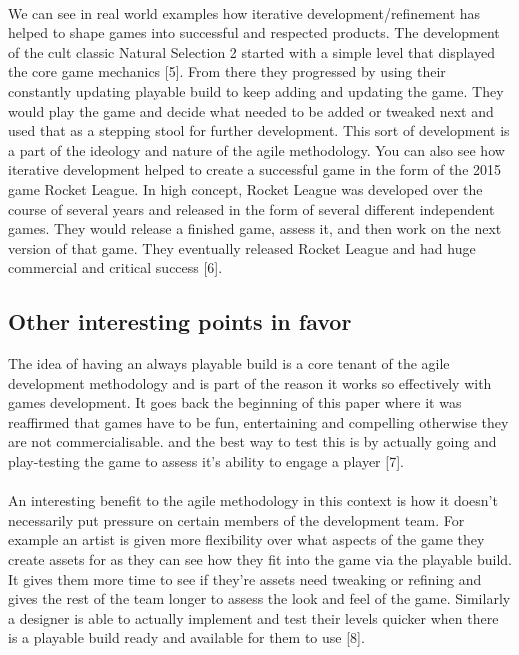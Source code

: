 \documentclass{article}
\begin{document}
\paragraph{}
We can see in real world examples how iterative development/refinement has helped to shape games into successful and respected products. The development of the cult classic Natural Selection 2 started with a simple level that displayed the core game mechanics [5]. From there they progressed by using their constantly updating playable build to keep adding and updating the game. They would play the game and decide what needed to be added or tweaked next and used that as a stepping stool for further development. This sort of development is a part of the ideology and nature of the agile methodology. You can also see how iterative development helped to create a successful game in the form of the 2015 game Rocket League. In high concept, Rocket League was developed over the course of several years and released in the form of several different independent games. They would release a finished game, assess it, and then work on the next version of that game. They eventually released Rocket League and had huge commercial and critical success [6].
\subsection{Other interesting points in favor}
The idea of having an always playable build is a core tenant of the agile development methodology and is part of the reason it works so effectively with games development. It goes back the beginning of this paper where it was reaffirmed that games have to be fun, entertaining and compelling otherwise they are not commercialisable. and the best way to test this is by actually going and play-testing the game to assess it's ability to engage a player [7].
\paragraph{}
An interesting benefit to the agile methodology in this context is how it doesn't necessarily put pressure on certain members of the development team. For example an artist is given more flexibility over what aspects of the game they create assets for as they can see how they fit into the game via the playable build. It gives them more time to see if they're assets need tweaking or refining and gives the rest of the team longer to assess the look and feel of the game. Similarly a designer is able to actually implement and test their levels quicker when there is a playable build ready and available for them to use [8].
\end{document}
